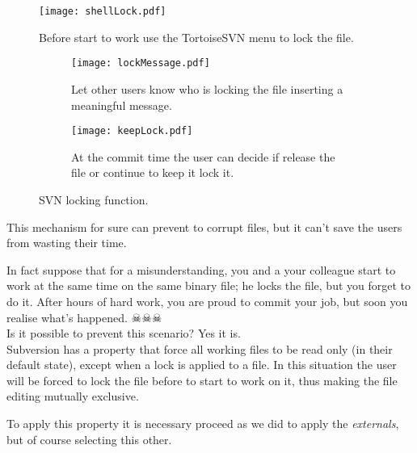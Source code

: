 \begin{figure}[htbp]
    \centering
    \texttt{[image: shellLock.pdf]}
    \caption{Before start to work use the TortoiseSVN menu to lock the file.}
    \label{fig:shellLock}
\end{figure}



\begin{figure}[htbp]
\begin{subfigure}{0.5\textwidth}
  \centering
  \texttt{[image: lockMessage.pdf]}
  \caption{Let other users know who is locking the file inserting a meaningful message.}
  \label{fig:lockMessage}
\end{subfigure}%
\hspace{5mm}
\begin{subfigure}{0.5\textwidth}
  \centering
  \texttt{[image: keepLock.pdf]}
  \caption{At the commit time the user can decide if release the file or continue to keep it lock it.}
  \label{fig:keepLock}
\end{subfigure}
\caption{SVN locking function.}
\label{fig:svnLocks}
\end{figure}



This mechanism for sure can prevent to corrupt files, but it can't save the users from wasting their time.\newline

In fact suppose that for a misunderstanding, you and a your colleague start to work at the same time on the same binary file; he locks the file, but you forget to do it. After hours of hard work, you are proud to commit your job, but soon you realise what's happened. $\skull \skull \skull$\\

Is it possible to prevent this scenario? Yes it is.\\

Subversion has a property that force all working files to be read only (in their default state), except when a lock is applied to a file. In this situation the user will be forced to lock the file before to start to work on it, thus making the file editing mutually exclusive.\newline

To apply this property it is necessary proceed as we did to apply the \textit{externals}, but of course selecting this other.


